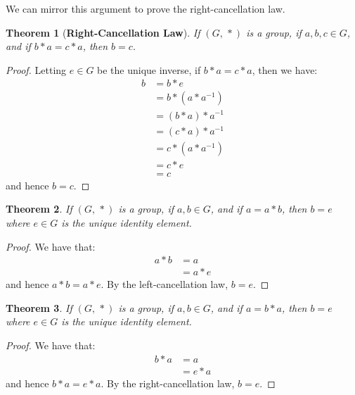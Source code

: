 \documentclass{article}
\theoremstyle{plain}
\newtheorem{theorem}{Theorem}[section]
\theoremstyle{normal}
\begin{document}
        We can mirror this argument to prove the right-cancellation law.
        \begin{theorem}[\textbf{Right-Cancellation Law}]
            If $(G,\,*)$ is a group, if $a,b,c\in{G}$, and if $b*a=c*a$, then
            $b=c$.
        \end{theorem}
        \begin{proof}
            Letting $e\in{G}$ be the unique inverse, if $b*a=c*a$, then we have:
            \begin{align}
                b&=b*e\tag{Identity}\\
                &=b*(a*a^{-1})\tag{Inverse}\\
                &=(b*a)*a^{-1}\tag{Associativity}\\
                &=(c*a)*a^{-1}\tag{Hypothesis}\\
                &=c*(a*a^{-1})\tag{Associativity}\\
                &=c*e\tag{Inverse}\\
                &=c\tag{Identity}
            \end{align}
            and hence $b=c$.
        \end{proof}
        \begin{theorem}
            If $(G,\,*)$ is a group, if $a,b\in{G}$, and if
            $a=a*b$, then $b=e$ where $e\in{G}$ is the unique identity element.
        \end{theorem}
        \begin{proof}
            We have that:
            \begin{align}
                a*b&=a\tag{Hypothesis}\\
                &=a*e\tag{Identity}
            \end{align}
            and hence $a*b=a*e$. By the left-cancellation law, $b=e$.
        \end{proof}
        \begin{theorem}
            If $(G,\,*)$ is a group, if $a,b\in{G}$, and if
            $a=b*a$, then $b=e$ where $e\in{G}$ is the unique identity element.
        \end{theorem}
        \begin{proof}
            We have that:
            \begin{align}
                b*a&=a\tag{Hypothesis}\\
                &=e*a\tag{Identity}
            \end{align}
            and hence $b*a=e*a$. By the right-cancellation law, $b=e$.
        \end{proof}
\end{document}
